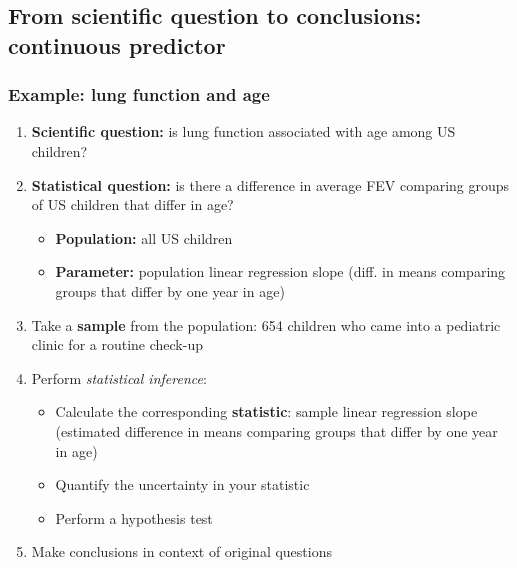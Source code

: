 \documentclass[12pt, 
hyperref={colorlinks=true, linkcolor=blue, urlcolor=cyan}]{beamer}
\begin{document}
\subsection{From scientific question to conclusions: continuous predictor}
\begin{frame}
\frametitle{Example: lung function and age}

\begin{enumerate}
\item \textbf{Scientific question:} is \color{blue} lung function \color{orange} associated \color{black} with age among US children? \pause
\item \textbf{Statistical question:} is there a \color{orange} difference in average \color{blue} FEV \color{black} comparing groups of US children that differ in age? \pause
	\begin{itemize}
	\item \textbf{Population:} all US children
	\item \textbf{Parameter:} population linear regression slope (diff. in means comparing groups that differ by one year in age) \pause
	\end{itemize}
\item Take a \textbf{sample} from the population: 654 children who came into a pediatric clinic for a routine check-up \pause
\item Perform \textit{statistical inference}:
	\begin{itemize}
	\item Calculate the corresponding \textbf{statistic}: sample linear regression slope (estimated difference in means comparing groups that differ by one year in age) \pause
	\item Quantify the uncertainty in your statistic
	\item Perform a hypothesis test \pause
	\end{itemize}
\item Make conclusions in context of original questions
\end{enumerate}

\end{frame}
\end{document}

